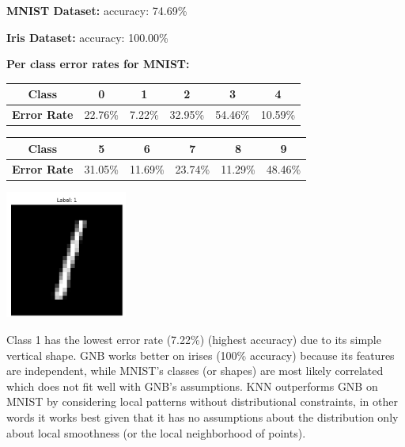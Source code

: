 \documentclass[12pt]{article}
\begin{document}
\begin{enumerate}
        \textbf{MNIST Dataset:} accuracy: 74.69\%

        \textbf{Iris Dataset:} accuracy: 100.00\%

        \textbf{Per class error rates for MNIST:}
        \begin{center}
        \begin{tabular}{|c|c|c|c|c|c|}
        \hline
        \textbf{Class} & 0 & 1 & 2 & 3 & 4 \\
        \hline
        \textbf{Error Rate} & 22.76\% & 7.22\% & 32.95\% & 54.46\% & 10.59\% \\
        \hline
        \end{tabular}
        \end{center}

        \begin{center}
        \begin{tabular}{|c|c|c|c|c|c|}
        \hline
        \textbf{Class} & 5 & 6 & 7 & 8 & 9 \\
        \hline
        \textbf{Error Rate} & 31.05\% & 11.69\% & 23.74\% & 11.29\% & 48.46\% \\
        \hline
        \end{tabular}
        \end{center}
        
        \begin{center}
        \includegraphics[width=0.3\textwidth]{class_1.png}
        \end{center}

        Class 1 has the lowest error rate (7.22\%) (highest accuracy) due to its simple vertical shape. GNB works better on irises (100\% accuracy) because its features are independent, while MNIST's classes (or shapes) are most likely correlated which does not fit well with GNB's assumptions. KNN outperforms GNB on MNIST by considering local patterns without distributional constraints, in other words it works best given that it has no assumptions about the distribution only about local smoothness (or the local neighborhood of points).

    \end{enumerate}
\end{document}
